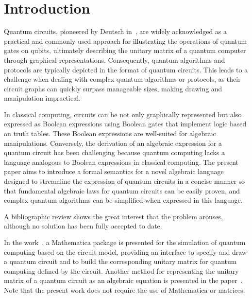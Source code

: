 \documentclass[sigconf,natbib=false]{acmart}
\begin{document}
\received{\today}
\received[revised]{\today}
\received[accepted]{\today}

\maketitle

\section{Introduction}

Quantum circuits, pioneered by Deutsch in~\cite{Deutsch1989}, are widely acknowledged as a practical and commonly used approach for illustrating the operations of quantum gates on qubits, ultimately describing the unitary matrix of a quantum computer through graphical representations. Consequently, quantum algorithms and protocols are typically depicted in the format of quantum circuits. This leads to a challenge when dealing with complex quantum algorithms or protocols, as their circuit graphs can quickly surpass manageable sizes, making drawing and manipulation impractical.

In classical computing, circuits can be not only graphically represented but also expressed as Boolean expressions using Boolean gates that implement logic based on truth tables. These Boolean expressions are well-suited for algebraic manipulations. Conversely, the derivation of an algebraic expression for a quantum circuit has been challenging because quantum computing lacks a language analogous to Boolean expressions in classical computing. The present paper aims to introduce a formal semantics for a novel algebraic language designed to streamline the expression of quantum circuits in a concise manner so that fundamental algebraic laws for quantum circuits can be easily proven, and complex quantum algorithms can be simplified when expressed in this language.

A bibliographic review shows the great interest that the problem arouses, although no solution has been fully accepted to date.

In the work~\cite{gerdt}, a Mathematica package is presented for the simulation of quantum computing based on the circuit model, providing an interface to specify and draw a quantum circuit and to build the corresponding unitary matrix for quantum computing defined by the circuit.
Another method for representing the unitary matrix of a quantum circuit as an algebraic equation is presented in the paper~\cite{Hutsell}.
Note that the present work does not require the use of Mathematica or matrices.
\end{document}

